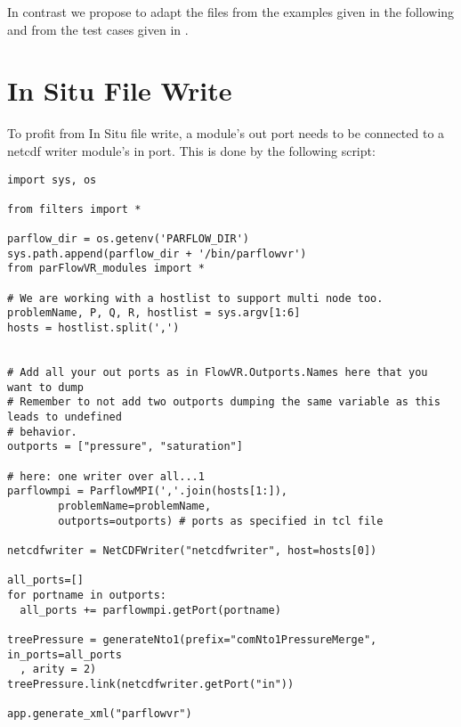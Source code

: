 In contrast we propose to adapt the  files from the examples given in the following
and from the test cases given in .
\section{In Situ File Write}
To profit from In Situ file write, a \parflow{} module's out port needs to be connected to
a netcdf writer module's in port. This is done by the following  script:

\begin{display}\begin{verbatim}
import sys, os

from filters import *

parflow_dir = os.getenv('PARFLOW_DIR')
sys.path.append(parflow_dir + '/bin/parflowvr')
from parFlowVR_modules import *

# We are working with a hostlist to support multi node too.
problemName, P, Q, R, hostlist = sys.argv[1:6]
hosts = hostlist.split(',')


# Add all your out ports as in FlowVR.Outports.Names here that you want to dump
# Remember to not add two outports dumping the same variable as this leads to undefined
# behavior.
outports = ["pressure", "saturation"]

# here: one writer over all...1
parflowmpi = ParflowMPI(','.join(hosts[1:]),
        problemName=problemName,
        outports=outports) # ports as specified in tcl file

netcdfwriter = NetCDFWriter("netcdfwriter", host=hosts[0])

all_ports=[]
for portname in outports:
  all_ports += parflowmpi.getPort(portname)

treePressure = generateNto1(prefix="comNto1PressureMerge", in_ports=all_ports
  , arity = 2)
treePressure.link(netcdfwriter.getPort("in"))

app.generate_xml("parflowvr")
\end{verbatim}\end{display}

